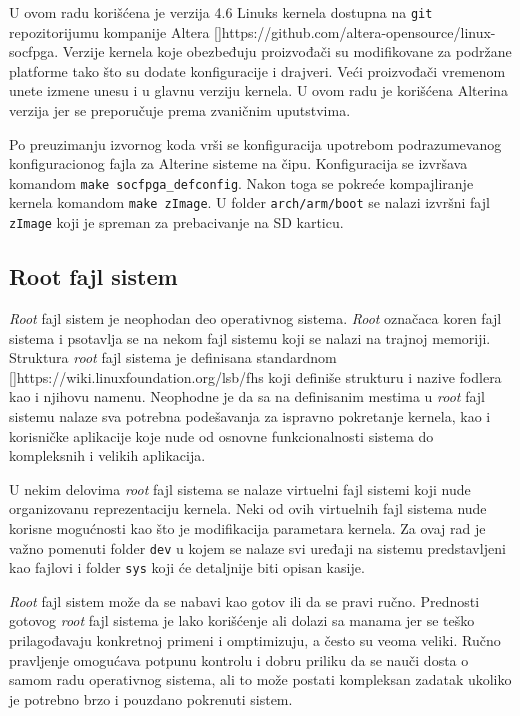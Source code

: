 U ovom radu korišćena je verzija 4.6 Linuks kernela dostupna na \texttt{git} repozitorijumu kompanije Altera []https://github.com/altera-opensource/linux-socfpga. Verzije kernela koje obezbeđuju proizvođači su modifikovane za podržane platforme tako što su dodate konfiguracije i drajveri. Veći proizvođači vremenom unete izmene unesu i u glavnu verziju kernela. U ovom radu je korišćena Alterina verzija jer se preporučuje prema zvaničnim uputstvima.

Po preuzimanju izvornog koda vrši se konfiguracija upotrebom podrazumevanog konfiguracionog fajla za Alterine sisteme na čipu. Konfiguracija se izvršava komandom \texttt{make socfpga\_defconfig}. Nakon toga se pokreće kompajliranje kernela komandom \texttt{make zImage}. U folder \texttt{arch/arm/boot} se nalazi izvršni fajl \texttt{zImage} koji je spreman za prebacivanje na SD karticu.
\subsection{Root fajl sistem}
\textit{Root} fajl sistem je neophodan deo operativnog sistema. \textit{Root} označaca koren fajl sistema i psotavlja se na nekom fajl sistemu koji se nalazi na trajnoj memoriji. Struktura \textit{root} fajl sistema je definisana standardnom []https://wiki.linuxfoundation.org/lsb/fhs koji definiše strukturu i nazive fodlera kao i njihovu namenu. Neophodne je da sa na definisanim mestima u \textit{root} fajl sistemu nalaze sva potrebna podešavanja za ispravno pokretanje kernela, kao i korisničke aplikacije koje nude od osnovne funkcionalnosti sistema do kompleksnih i velikih aplikacija.

U nekim delovima \textit{root} fajl sistema se nalaze virtuelni fajl sistemi koji nude organizovanu reprezentaciju kernela. Neki od ovih virtuelnih fajl sistema nude korisne mogućnosti kao što je modifikacija parametara kernela. Za ovaj rad je važno pomenuti folder \texttt{dev} u kojem se nalaze svi uređaji na sistemu predstavljeni kao fajlovi i folder \texttt{sys} koji će detaljnije biti opisan kasije.

\textit{Root} fajl sistem može da se nabavi kao gotov ili da se pravi ručno. Prednosti gotovog \textit{root} fajl sistema je lako korišćenje ali dolazi sa manama jer se teško prilagođavaju konkretnoj primeni i omptimizuju, a često su veoma veliki. Ručno pravljenje omogućava potpunu kontrolu i dobru priliku da se nauči dosta o samom radu operativnog sistema, ali to može postati kompleksan zadatak ukoliko je potrebno brzo i pouzdano pokrenuti sistem.

